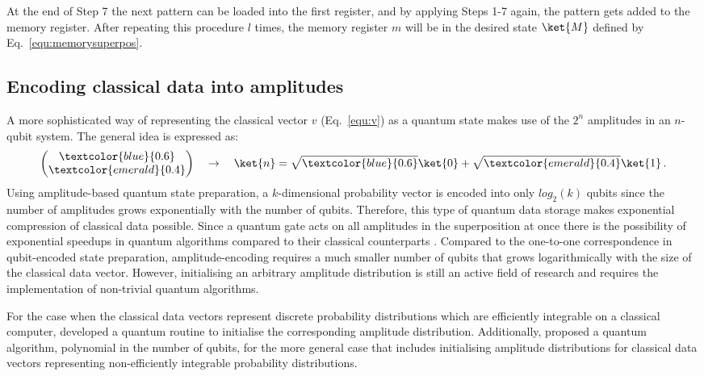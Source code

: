 At the end of Step 7 the next pattern can be loaded into the first register, and by applying Steps 1-7 again, the pattern gets added to the memory register. After repeating this procedure $l$ times, the memory register $m$ will be in the desired state $\ket{M}$ defined by Eq.~\ref{equ:memorysuperpos}.

\subsection{Encoding classical data into amplitudes}
\label{subsubsec:classicaldataamplitudes}

A more sophisticated way of representing the classical vector $v$ (Eq.~\ref{equ:v}) as a quantum state makes use of the $2^n$ amplitudes in an $n$-qubit system. The general idea is expressed as:
\begin{equation}
\label{equ:amplitudedata}
\begin{pmatrix}
 \textcolor{blue}{0.6} \\ 
 \textcolor{emerald}{0.4}
 \end{pmatrix} \quad \rightarrow \quad \ket{n} = \sqrt{\textcolor{blue}{0.6}}\ket{0}+\sqrt{\textcolor{emerald}{0.4}}\ket{1}\, .
\end{equation}
Using amplitude-based quantum state preparation, a $k$-dimensional probability vector is encoded into only $log_{2}(k)$ qubits since the number of amplitudes grows exponentially with the number of qubits. Therefore, this type of quantum data storage makes exponential compression of classical data possible. Since a quantum gate acts on all amplitudes in the superposition at once there is the possibility of exponential speedups in quantum algorithms compared to their classical counterparts \cite{nielsen2010quantum}. Compared to the one-to-one correspondence in qubit-encoded state preparation, amplitude-encoding requires a much smaller number of qubits that grows logarithmically with the size of the classical data vector. However, initialising an arbitrary amplitude distribution is still an active field of research and requires the implementation of non-trivial quantum algorithms.

For the case when the classical data vectors represent discrete probability distributions which are efficiently integrable on a classical computer,  developed a quantum routine to initialise the corresponding amplitude distribution.
Additionally,  proposed a quantum algorithm, polynomial in the number of qubits, for the more general case that includes initialising amplitude distributions for classical data vectors representing non-efficiently integrable probability distributions.

